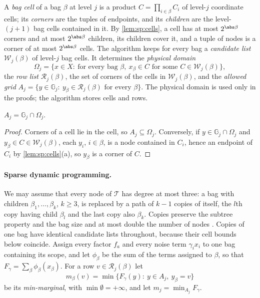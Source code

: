 A \emph{bag cell} of a bag $\beta$ at level $j$ is a product
$C=\prod_{i\in\beta}C_i$ of level-$j$ coordinate cells; its \emph{corners}
are the tuples of endpoints, and its \emph{children} are the level-$(j+1)$
bag cells contained in it. By \cref{lem:sp:cells}, a cell has at most
$2^{\abs\beta}$ corners and at most $2^{\abs\beta}$ children, its children
cover it, and a tuple of nodes is a corner of at most $2^{\abs\beta}$ cells.
The algorithm keeps for every bag a \emph{candidate list} $\mathcal W_j(\beta)$
of level-$j$ bag cells. It determines the \emph{physical domain}
\[
 \Omega_j=\{x\in X:\ \text{for every bag }\beta,\ x_\beta\in C
 \text{ for some }C\in\mathcal W_j(\beta)\},
\]
the \emph{row list} $\mathcal R_j(\beta)$, the set of corners of the cells in
$\mathcal W_j(\beta)$, and the \emph{allowed grid}
$A_j=\{y\in\mathbb G_j:\ y_\beta\in\mathcal R_j(\beta)\text{ for every }\beta\}$.
The physical domain is used only in the proofs; the algorithm stores cells
and rows.

\begin{lemma}\label{lem:sp:allowed}
$A_j=\mathbb G_j\cap\Omega_j$.
\end{lemma}

\begin{proof}
Corners of a cell lie in the cell, so $A_j\subseteq\Omega_j$. Conversely, if
$y\in\mathbb G_j\cap\Omega_j$ and $y_\beta\in C\in\mathcal W_j(\beta)$, each
$y_i$, $i\in\beta$, is a node contained in $C_i$, hence an endpoint of $C_i$
by \cref{lem:sp:cells}(a), so $y_\beta$ is a corner of $C$.
\end{proof}

\paragraph{Sparse dynamic programming.}
We may assume that every node of $\mathcal T$ has degree at most three:
a bag with children $\beta_1,\dots,\beta_k$, $k\ge3$, is replaced by a path
of $k-1$ copies of itself, the $l$th copy having child $\beta_l$ and the last
copy also $\beta_k$. Copies preserve the subtree property and the bag size
and at most double the number of nodes \citep{kloks1994-treewidth-computations-and-approximations}. Copies of one bag
have identical candidate lists throughout, because their cell bounds below
coincide. Assign every factor $f_a$ and every noise term $\gamma_ix_i$ to one
bag containing its scope, and let $\phi_\beta$ be the sum of the terms
assigned to $\beta$, so that $F_\gamma=\sum_\beta\phi_\beta(x_\beta)$. For a
row $v\in\mathcal R_j(\beta)$ let
\[
 m_\beta(v)=\min\{F_\gamma(y):\ y\in A_j,\ y_\beta=v\}
\]
be its \emph{min-marginal}, with $\min\emptyset=+\infty$, and let
$m_j=\min_{A_j}F_\gamma$.

